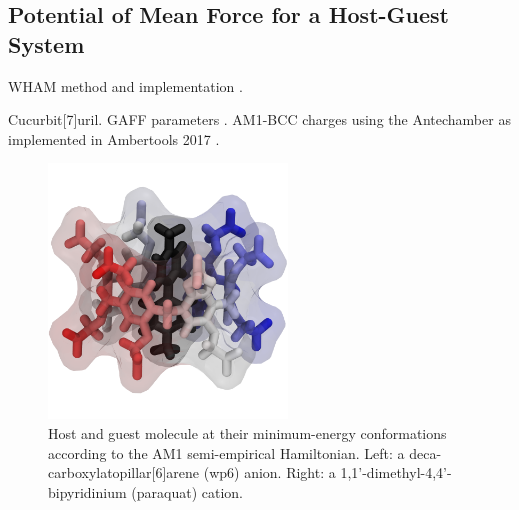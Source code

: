 \documentclass[
    journal=jctcce,
    layout=twocolumn
]{achemso}
\newcommand{\avg}[1]{\overline{#1}}             %
\begin{document}
%


\subsection{Potential of Mean Force for a Host-Guest System}

WHAM method\cite{Ferrenberg_1989, *Kumar_1992} and implementation \cite{Grossfield_nodate}.

Cucurbit[7]uril. GAFF parameters \cite{Wang_2004}. AM1-BCC charges \cite{Jakalian_2000, *Jakalian_2002} using the Antechamber \cite{Wang_2006} as implemented in Ambertools 2017 \cite{Case_2017}.


\begin{figure}
	\label{fig:carboxylatopillar[6]arene}
	\centering
	\includegraphics[width=2.5in]{wp6_paraquat.png}
	\caption{Host and guest molecule at their minimum-energy conformations according to the AM1 semi-empirical Hamiltonian. Left: a deca-carboxylatopillar[6]arene (wp6) anion. Right: a 1,1'-dimethyl-4,4'-bipyridinium (paraquat) cation.}
\end{figure}
\end{document}
